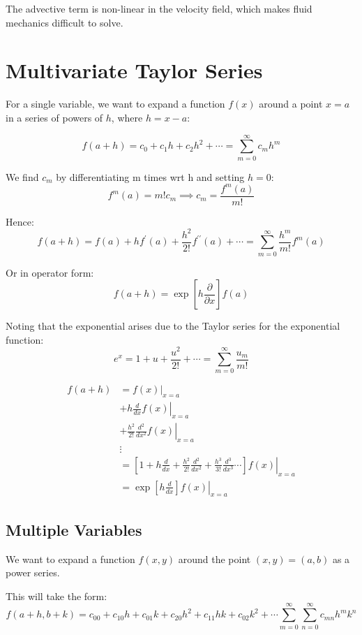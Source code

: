 The advective term is non-linear in the velocity field, which makes fluid mechanics difficult to solve.

\section{Multivariate Taylor Series}
For a single variable, we want to expand a function $f(x)$ around a point $x = a$ in a series of powers of $h$, where $h = x - a$:

\[
    f(a + h) = c_0 + c_1 h + c_2 h^2 + \cdots = \sum_{m=0}^{\infty} c_m h^m
\]

We find $c_m$ by differentiating m times wrt h and setting $h = 0$:
\[
    f^m(a) = m! c_m \implies c_m = \frac{f^m (a)}{m!}
\]

Hence:
\[
    f(a+h) = f(a) + hf^\prime(a) + \frac{h^2}{2!} f^{\prime\prime} (a) + \cdots = \sum_{m=0}^{\infty} \frac{h^m}{m!} f^m(a)
\]

Or in operator form:
\[
    f(a+h) = \exp \left[h \frac{\partial}{\partial x}\right] f(a)
\]

Noting that the exponential arises due to the Taylor series for the exponential function:
\[
    e^x = 1 + u + \frac{u^2}{2!} + \cdots = \sum_{m=0}^{\infty} \frac{u_m}{m!}
\]

\[
    \begin{aligned}
    f(a+h) &= \left. f(x) \right|_{x=a} \\
    &+ \left. h \frac{d}{dx} f(x) \right|_{x=a} \\
    &+ \left. \frac{h^2}{2!} \frac{d^2}{dx^2} f(x) \right|_{x=a} \\
    &\vdots \\
    &= \left. \left[ 1 + h \frac{d}{dx} + \frac{h^2}{2!} \frac{d^2}{dx^2} + \frac{h^3}{3!} \frac{d^3}{dx^3} \cdots \right] f(x) \right|_{x=a} \\
    &= \left. \exp \left[ h \frac{d}{dx} \right] f(x) \right|_{x=a}
\end{aligned}
\]


\subsection{Multiple Variables}
We want to expand a function $f(x, y)$ around the point $(x, y) = (a, b)$ as a power series.

This will take the form:
\[
    f(a+h, b+k) = c_{00} + c_{10} h + c_{01}k + c_{20} h^2 + c_{11}hk + c_{02}k^2 + \cdots \sum_{m=0}^{\infty} \sum_{n=0}^{\infty} c_{mn} h^m k^n
\]

